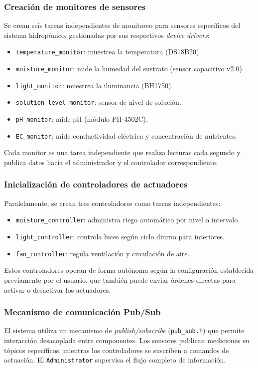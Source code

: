 \subsubsection*{Creación de monitores de sensores}
Se crean seis tareas independientes de monitoreo para sensores específicos del sistema hidropónico, gestionadas por sus respectivos \textit{device drivers}:

\begin{itemize}
    \item \texttt{temperature\_monitor}: muestrea la temperatura (DS18B20).
    \item \texttt{moisture\_monitor}: mide la humedad del sustrato (sensor capacitivo v2.0).
    \item \texttt{light\_monitor}: muestrea la iluminancia (BH1750).
    \item \texttt{solution\_level\_monitor}: sensor de nivel de solución.
    \item \texttt{pH\_monitor}: mide pH (módulo PH-4502C).
    \item \texttt{EC\_monitor}: mide conductividad eléctrica y concentración de nutrientes.
\end{itemize}

Cada monitor es una tarea independiente que realiza lecturas cada segundo y publica datos hacia el administrador y el controlador correspondiente.

\subsubsection*{Inicialización de controladores de actuadores}
Paralelamente, se crean tres controladores como tareas independientes:

\begin{itemize}
    \item \texttt{moisture\_controller}: administra riego automático por nivel o intervalo.
    \item \texttt{light\_controller}: controla luces según ciclo diurno para interiores.
    \item \texttt{fan\_controller}: regula ventilación y circulación de aire.
\end{itemize}

Estos controladores operan de forma autónoma según la configuración establecida previamente por el usuario, que también puede enviar órdenes directas para activar o desactivar los actuadores.

\subsubsection*{Mecanismo de comunicación Pub/Sub}
El sistema utiliza un mecanismo de \textit{publish/subscribe} (\texttt{pub\_sub.h}) que permite interacción desacoplada entre componentes. Los sensores publican mediciones en tópicos específicos, mientras los controladores se suscriben a comandos de actuación. El \texttt{Administrator} supervisa el flujo completo de información.

